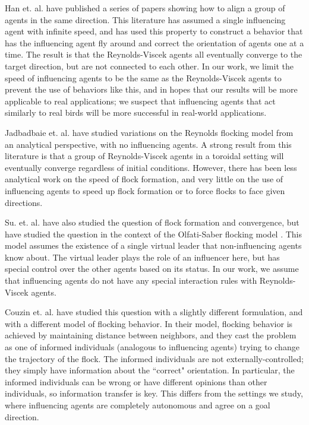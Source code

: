 Han et. al. have \cite{han2010teleporting} published a series of papers showing
how to align a group of agents in the same direction.
This literature has assumed a single influencing agent with infinite speed, and
has used this property to construct a behavior that has the influencing agent
fly around and correct the orientation of agents one at a time.
The result is that the Reynolds-Viscek agents all eventually converge to the
target direction, but are not connected to each other.
In our work, we limit the speed of influencing agents to be the same as the
Reynolds-Viscek agents to prevent the use of behaviors like this, and in hopes
that our results will be more applicable to real applications; we suspect that
influencing agents that act similarly to real birds will be more successful in
real-world applications.

Jadbadbaie et. al. \cite{jad2003convergence} have studied variations on the
Reynolds flocking model from an analytical perspective, with no influencing
agents.
A strong result from this literature is that a group of Reynolds-Viscek agents
in a toroidal setting will eventually converge regardless of initial
conditions.
However, there has been less analytical work on the speed of flock formation,
and very little on the use of influencing agents to speed up flock formation or
to force flocks to face given directions.

Su. et. al. \cite{su2009virtualleaderinformed} have also studied the question
of flock formation and convergence, but have studied the question in the
context of the Olfati-Saber flocking model
\cite{olfati2006virtualleaderinformed}.
This model assumes the existence of a single virtual leader that
non-influencing agents know about.
The virtual leader plays the role of an influencer here, but has special
control over the other agents based on its status.
In our work, we assume that influencing agents do not have any special
interaction rules with Reynolds-Viscek agents.

Couzin et. al. \cite{couzin2005} have studied this question with a slightly
different formulation, and with a different model of flocking behavior.
In their model, flocking behavior is achieved by maintaining distance between
neighbors, and they cast the problem as one of informed individuals (analogous
to influencing agents) trying to change the trajectory of the flock.
The informed individuals are not externally-controlled; they simply have
information about the ``correct" orientation.
In particular, the informed individuals can be wrong or have different opinions
than other individuals, so information transfer is key.
This differs from the settings we study, where influencing agents are
completely autonomous and agree on a goal direction.

